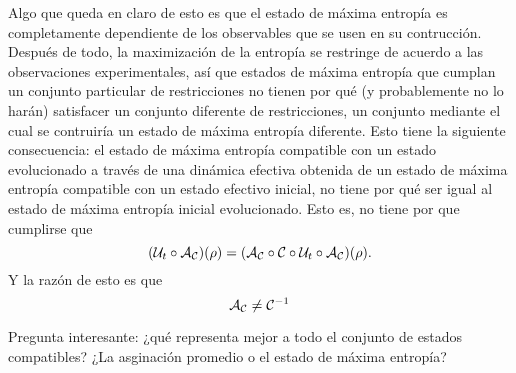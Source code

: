 Algo que queda en claro de esto es que el estado de máxima entropía es completamente dependiente de los observables que se usen en su contrucción. Después de todo, la maximización de la entropía se restringe de acuerdo a las observaciones experimentales, así que estados de máxima entropía que cumplan un conjunto particular de restricciones no tienen por qué (y probablemente no lo harán) satisfacer un conjunto diferente de restricciones, un conjunto mediante el cual se contruiría un estado de máxima entropía diferente. Esto tiene la siguiente consecuencia: el estado de máxima entropía compatible con un estado evolucionado a través de una dinámica efectiva obtenida de un estado de máxima entropía compatible con un estado efectivo inicial, no tiene por qué ser igual al estado de máxima entropía inicial evolucionado. Esto es, no tiene por que cumplirse que
\begin{equation*}
    (\mathcal{U}_{t}\circ\mathcal{A}_{\mathcal{C}})(\rho) = (\mathcal{A}_{\mathcal{C}}\circ\mathcal{C} \circ \mathcal{U}_t \circ \mathcal{A}_{\mathcal{C}})(\rho).
\end{equation*}
Y la razón de esto es que
\begin{equation*}
    \mathcal{A}_{\mathcal{C}}\neq\mathcal{C}^{-1}
\end{equation*}

Pregunta interesante: ¿qué representa mejor a todo el conjunto de estados compatibles? ¿La asginación promedio o el estado de máxima entropía?


